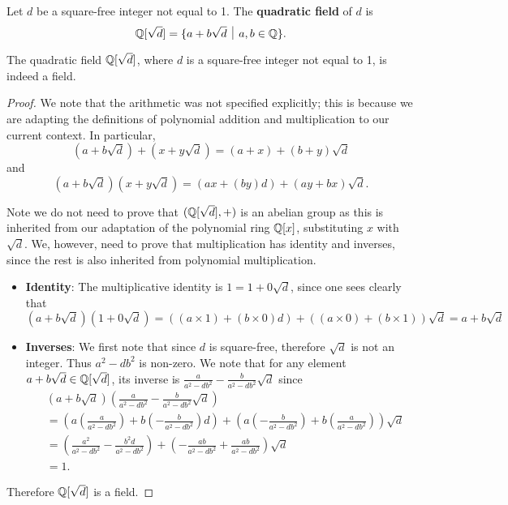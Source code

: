 \begin{definition}
    Let $d$ be a square-free integer not equal to 1. The \textbf{quadratic field} of $d$ is
    \[
        \Q[\sqrt{d}] = \{a + b\sqrt{d} \vert a,b\in\Q\}.
    \]
\end{definition}
\begin{proposition}
    The quadratic field $\mathbb{Q}[\sqrt{d}]$, where $d$ is a square-free integer not equal to 1, is indeed a field.
\end{proposition}
\begin{proof}
    We note that the arithmetic was not specified explicitly; this is because we are adapting the definitions of polynomial addition and multiplication to our current context. In particular,
    \[
        (a+b\sqrt{d}) + (x + y\sqrt{d}) = (a+x) + (b+y)\sqrt{d}
    \]
    and
    \[
        (a+b\sqrt{d})(x+y\sqrt{d}) = (ax+(by)d) + (ay + bx)\sqrt{d}.
    \]

    Note we do not need to prove that $(\mathbb{Q}[\sqrt{d}], +)$ is an abelian group as this is inherited from our adaptation of the polynomial ring $\mathbb{Q}[x]$, substituting $x$ with $\sqrt{d}$. We, however, need to prove that multiplication has identity and inverses, since the rest is also inherited from polynomial multiplication.

    \begin{itemize}
        \item \textbf{Identity}: The multiplicative identity is $1 = 1 + 0\sqrt{d}$, since one sees clearly that
        \[
            (a+b\sqrt{d})(1+0\sqrt{d}) = ((a\times1) + (b\times0)d) + ((a\times0) + (b \times 1))\sqrt{d} = a + b\sqrt{d}
        \]

        \item \textbf{Inverses}: We first note that since $d$ is square-free, therefore $\sqrt{d}$ is not an integer. Thus $a^2 - db^2$ is non-zero. We note that for any element $a+b\sqrt{d} \in \mathbb{Q}[\sqrt{d}]$, its inverse is $\frac{a}{a^2-db^2} - \frac{b}{a^2-db^2}\sqrt{d}$ since
        \begin{align*}
            &(a+b\sqrt{d})\left(\frac{a}{a^2-db^2} - \frac{b}{a^2-db^2}\sqrt{d}\right)\\
            &= \left(a\left(\frac{a}{a^2-db^2}\right) + b\left(-\frac{b}{a^2-db^2}\right)d\right) + \left(a\left(-\frac{b}{a^2-db^2}\right) + b\left(\frac{a}{a^2-db^2}\right)\right)\sqrt{d}\\
            &=\left(\frac{a^2}{a^2-db^2} -\frac{b^2d}{a^2-db^2}\right) + \left(-\frac{ab}{a^2-db^2} + \frac{ab}{a^2-db^2}\right)\sqrt{d}\\
            &=1.
        \end{align*}
    \end{itemize}

    Therefore $\mathbb{Q}[\sqrt{d}]$ is a field.
\end{proof}

